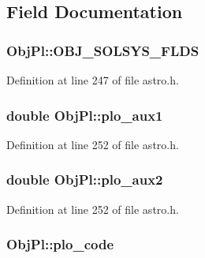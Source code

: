 \subsection{Field Documentation}
\hypertarget{struct_obj_pl_a758fc78bac5693d80061b5287111660b}{
\subsubsection[{O\-B\-J\-\_\-\-S\-O\-L\-S\-Y\-S\-\_\-\-F\-L\-D\-S}]{\setlength{\rightskip}{0pt plus 5cm}Obj\-Pl\-::\-O\-B\-J\-\_\-\-S\-O\-L\-S\-Y\-S\-\_\-\-F\-L\-D\-S}}\label{struct_obj_pl_a758fc78bac5693d80061b5287111660b}


Definition at line 247 of file astro.\-h.

\hypertarget{struct_obj_pl_a24eecaf3b6c18c76b37a7bdbe25aaf36}{
\subsubsection[{plo\-\_\-aux1}]{\setlength{\rightskip}{0pt plus 5cm}double Obj\-Pl\-::plo\-\_\-aux1}}\label{struct_obj_pl_a24eecaf3b6c18c76b37a7bdbe25aaf36}


Definition at line 252 of file astro.\-h.

\hypertarget{struct_obj_pl_a255117a42ec67b58e521a19136d27af2}{
\subsubsection[{plo\-\_\-aux2}]{\setlength{\rightskip}{0pt plus 5cm}double Obj\-Pl\-::plo\-\_\-aux2}}\label{struct_obj_pl_a255117a42ec67b58e521a19136d27af2}


Definition at line 252 of file astro.\-h.

\hypertarget{struct_obj_pl_afb2477614c13497d5437e74077dfa1ee}{
\subsubsection[{plo\-\_\-code}]{ Obj\-Pl\-::plo\-\_\-code}}\label{struct_obj_pl_afb2477614c13497d5437e74077dfa1ee}



